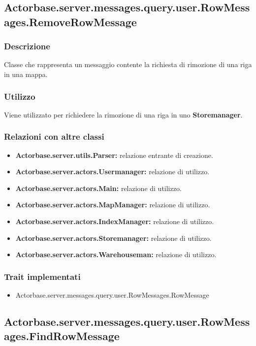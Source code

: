 \documentclass[a4paper]{article}
\begin{document}
		\subsection{Actorbase.server.messages.query.user.RowMessages.RemoveRowMessage}
			\subsubsection{Descrizione}
				Classe che rappresenta un messaggio contente la richiesta di rimozione di una riga in una mappa.
				
			\subsubsection{Utilizzo}
				Viene utilizzato per richiedere la rimozione di una riga in uno \textbf{Storemanager}.
				
			\subsubsection{Relazioni con altre classi}
				\begin{itemize}
					\item \textbf{Actorbase.server.utils.Parser:} relazione entrante di creazione.
					\item \textbf{Actorbase.server.actors.Usermanager:} relazione di utilizzo.
					\item \textbf{Actorbase.server.actors.Main:} relazione di utilizzo.
					\item \textbf{Actorbase.server.actors.MapManager:} relazione di utilizzo.
					\item \textbf{Actorbase.server.actors.IndexManager:} relazione di utilizzo.
					\item \textbf{Actorbase.server.actors.Storemanager:} relazione di utilizzo.
					\item \textbf{Actorbase.server.actors.Warehouseman:} relazione di utilizzo.
				\end{itemize}
			\subsubsection{Trait implementati}
				\begin{itemize}
					\item Actorbase.server.messages.query.user.RowMessages.RowMessage
				\end{itemize}
				
		\subsection{Actorbase.server.messages.query.user.RowMessages.FindRowMessage}
\end{document}
